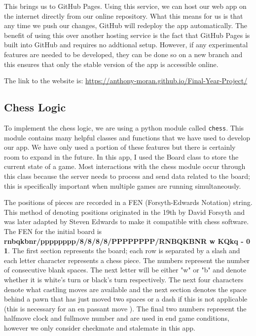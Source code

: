 This brings us to GitHub Pages. Using this service, we can host our web app on the internet directly from our online repository. What this means for us is that any time we push our changes, GitHub will redeploy the app automatically. The benefit of using this over another hosting service is the fact that GitHub Pages is built into GitHub and requires no addtional setup. However, if any experimental features are needed to be developed, they can be done so on a new branch and this ensures that only the stable version of the app is accessible online.

The link to the website is: \url{https://anthony-moran.github.io/Final-Year-Project/}

\subsection{Chess Logic}

To implement the chess logic, we are using a python module called \lstinline{chess}. This module contains many helpful classes and functions that we have used to develop our app. We have only used a portion of these features but there is certainly room to expand in the future. In this app, I used the Board class to store the current state of a game. Most interactions with the chess module occur through this class because the server needs to process and send data related to the board; this is specifically important when multiple games are running simultaneously.

The positions of pieces are recorded in a FEN (Forsyth-Edwards Notation) \cite{PGNStandard} string. This method of denoting positions originated in the 19th by David Forsyth and was later adapted by Steven Edwards to make it compatible with chess software. The FEN for the initial board is \textbf{rnbqkbnr/pppppppp/8/8/8/8/PPPPPPPP/RNBQKBNR w KQkq - 0 1}. The first section represents the board; each row is separated by a slash and each letter character represents a chess piece. The numbers represent the number of consecutive blank spaces. The next letter will be either "w" or "b" and denote whether it is white's turn or black's turn respectively. The next four characters denote what castling moves are available and the next section denotes the space behind a pawn that has just moved two spaces or a dash if this is not applicable (this is necessary for an en passant move \cite{EnPassant}). The final two numbers represent the halfmove clock and fullmove number and are used in end game conditions, however we only consider checkmate and stalemate in this app.


